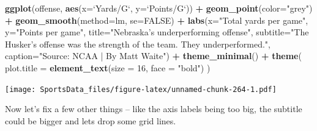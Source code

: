 \documentclass[]{book}
\newenvironment{Shaded}{\begin{snugshade}}{\end{snugshade}}
\newcommand{\DataTypeTok}[1]{\textcolor[rgb]{0.13,0.29,0.53}{#1}}
\newcommand{\DecValTok}[1]{\textcolor[rgb]{0.00,0.00,0.81}{#1}}
\newcommand{\KeywordTok}[1]{\textcolor[rgb]{0.13,0.29,0.53}{\textbf{#1}}}
\newcommand{\NormalTok}[1]{#1}
\newcommand{\OperatorTok}[1]{\textcolor[rgb]{0.81,0.36,0.00}{\textbf{#1}}}
\newcommand{\OtherTok}[1]{\textcolor[rgb]{0.56,0.35,0.01}{#1}}
\newcommand{\StringTok}[1]{\textcolor[rgb]{0.31,0.60,0.02}{#1}}
\begin{document}
\begin{Shaded}
\begin{Highlighting}[]
\KeywordTok{ggplot}\NormalTok{(offense, }\KeywordTok{aes}\NormalTok{(}\DataTypeTok{x=}\StringTok{`}\DataTypeTok{Yards/G}\StringTok{`}\NormalTok{, }\DataTypeTok{y=}\StringTok{`}\DataTypeTok{Points/G}\StringTok{`}\NormalTok{)) }\OperatorTok{+}\StringTok{ }
\StringTok{  }\KeywordTok{geom_point}\NormalTok{(}\DataTypeTok{color=}\StringTok{"grey"}\NormalTok{) }\OperatorTok{+}\StringTok{ }\KeywordTok{geom_smooth}\NormalTok{(}\DataTypeTok{method=}\NormalTok{lm, }\DataTypeTok{se=}\OtherTok{FALSE}\NormalTok{) }\OperatorTok{+}\StringTok{ }
\StringTok{  }\KeywordTok{labs}\NormalTok{(}\DataTypeTok{x=}\StringTok{"Total yards per game"}\NormalTok{, }\DataTypeTok{y=}\StringTok{"Points per game"}\NormalTok{, }\DataTypeTok{title=}\StringTok{"Nebraska's underperforming offense"}\NormalTok{, }\DataTypeTok{subtitle=}\StringTok{"The Husker's offense was the strength of the team. They underperformed."}\NormalTok{, }\DataTypeTok{caption=}\StringTok{"Source: NCAA | By Matt Waite"}\NormalTok{) }\OperatorTok{+}\StringTok{ }
\StringTok{  }\KeywordTok{theme_minimal}\NormalTok{() }\OperatorTok{+}\StringTok{ }
\StringTok{  }\KeywordTok{theme}\NormalTok{(}
    \DataTypeTok{plot.title =} \KeywordTok{element_text}\NormalTok{(}\DataTypeTok{size =} \DecValTok{16}\NormalTok{, }\DataTypeTok{face =} \StringTok{"bold"}\NormalTok{)}
\NormalTok{    ) }
\end{Highlighting}
\end{Shaded}

\texttt{[image: SportsData\_files/figure-latex/unnamed-chunk-264-1.pdf]}

Now let's fix a few other things -- like the axis labels being too big, the subtitle could be bigger and lets drop some grid lines.
\end{document}

